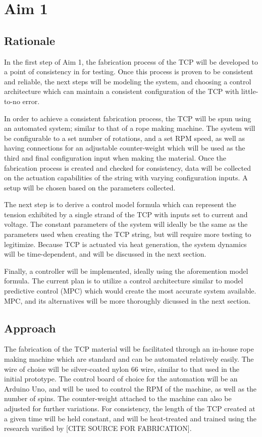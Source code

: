 \section{Aim 1}

\subsection{Rationale}

In the first step of Aim 1, the fabrication process of the TCP will be developed to a point of consistency in for testing. Once this process is proven to be consistent and reliable, the next steps will be modeling the system, and choosing a control architecture which can maintain a consistent configuration of the TCP with little-to-no error.

In order to achieve a consistent fabrication process, the TCP will be spun using an automated system; similar to that of a rope making machine. The system will be configurable to a set number of rotations, and a set RPM speed, as well as having connections for an adjustable counter-weight which will be used as the third and final configuration input when making the material. Once the fabrication process is created and checked for consistency, data will be collected on the actuation capabilities of the string with varying configuration inputs. A setup will be chosen based on the parameters collected.

The next step is to derive a control model formula which can represent the tension exhibited by a single strand of the TCP with inputs set to current and voltage. The constant parameters of the system will ideally be the same as the parameters used when creating the TCP string, but will require more testing to legitimize. Because TCP is actuated via heat generation, the system dynamics will be time-dependent, and will be discussed in the next section.

Finally, a controller will be implemented, ideally using the aforemention model formula. The current plan is to utilize a control architecture similar to model predictive control (MPC) which would create the most accurate system available. MPC, and its alternatives will be more thoroughly dicussed in the next section.

\subsection{Approach}

The fabrication of the TCP material will be facilitated through an in-house rope making machine which are standard and can be automated relatively easily. The wire of choise will be silver-coated nylon 66 wire, similar to that used in the initial prototype. The control board of choice for the automation will be an Arduino Uno, and will be used to control the RPM of the machine, as well as the number of spins. The counter-weight attached to the machine can also be adjusted for further variations. For consistency, the length of the TCP created at a given time will be held constant, and will be heat-treated and trained using the research varified by [CITE SOURCE FOR FABRICATION].

